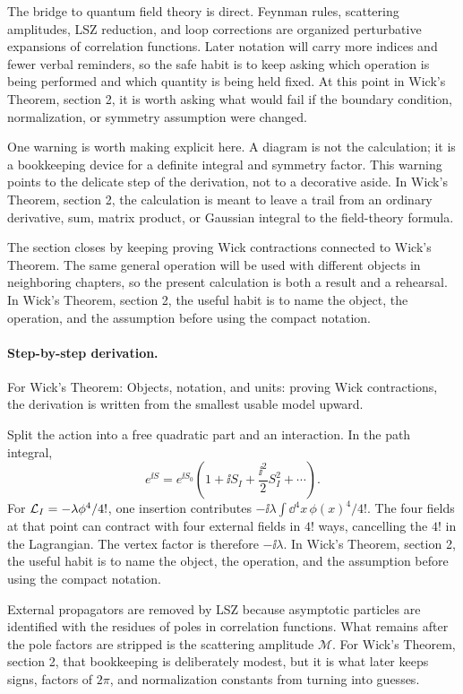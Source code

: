 The bridge to quantum field theory is direct.  Feynman rules, scattering amplitudes, LSZ reduction, and loop corrections are organized perturbative expansions of correlation functions.  Later notation will carry more indices and fewer verbal reminders, so the safe habit is to keep asking which operation is being performed and which quantity is being held fixed.  At this point in Wick's Theorem, section 2, it is worth asking what would fail if the boundary condition, normalization, or symmetry assumption were changed.

One warning is worth making explicit here.  A diagram is not the calculation; it is a bookkeeping device for a definite integral and symmetry factor.  This warning points to the delicate step of the derivation, not to a decorative aside.  In Wick's Theorem, section 2, the calculation is meant to leave a trail from an ordinary derivative, sum, matrix product, or Gaussian integral to the field-theory formula.

The section closes by keeping proving Wick contractions connected to Wick's Theorem.  The same general operation will be used with different objects in neighboring chapters, so the present calculation is both a result and a rehearsal.  In Wick's Theorem, section 2, the useful habit is to name the object, the operation, and the assumption before using the compact notation.



\paragraph{Step-by-step derivation.}

For Wick's Theorem: Objects, notation, and units: proving Wick contractions, the derivation is written from the smallest usable model upward.

Split the action into a free quadratic part and an interaction.  In the path integral,
\[
  e^{\ii S}=e^{\ii S_0}\left(1+\ii S_I+\frac{\ii^2}{2}S_I^2+\cdots\right).
\]
For \(\mathcal L_I=-\lambda\phi^4/4!\), one insertion contributes \(-\ii\lambda\int\dd^4x\,\phi(x)^4/4!\).  The four fields at that point can contract with four external fields in \(4!\) ways, cancelling the \(4!\) in the Lagrangian.  The vertex factor is therefore \(-\ii\lambda\).  In Wick's Theorem, section 2, the useful habit is to name the object, the operation, and the assumption before using the compact notation.

External propagators are removed by LSZ because asymptotic particles are identified with the residues of poles in correlation functions.  What remains after the pole factors are stripped is the scattering amplitude \(\mathcal M\).  For Wick's Theorem, section 2, that bookkeeping is deliberately modest, but it is what later keeps signs, factors of \(2\pi\), and normalization constants from turning into guesses.

